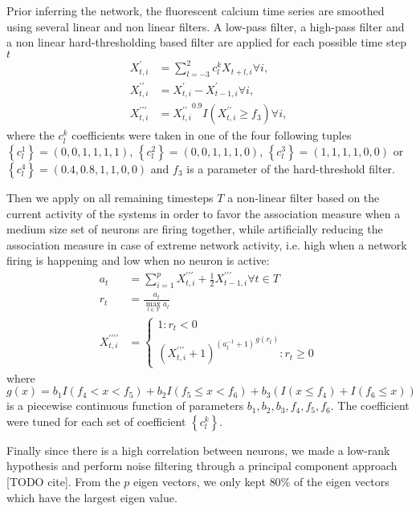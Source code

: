 \documentclass[wcp]{jmlr}
\begin{document}
Prior inferring the network, the fluorescent calcium time series are smoothed
using several linear and non linear filters. A low-pass filter, a high-pass
filter and a non linear hard-thresholding based filter are
applied for each possible time step $t$
\begin{align}
X^\prime_{t,i} &= \sum_{l=-3}^2 c_l^k X_{t+l,i} \forall i, \\
X^{\prime\prime}_{t,i} &= X^{\prime}_{t,i} - X^{\prime}_{t-1,i} \forall i, \\
X^{\prime\prime\prime}_{t,i} &= {X^{\prime\prime}_{t,i}}^{0.9} I(X^{\prime\prime}_{t,i} \geq f_3) \forall i,
\end{align}
where the $c_l^k$ coefficients were taken in one of the four following tuples
$\left\{c_l^1\right\}=(0, 0, 1, 1, 1, 1)$,
$\left\{c_l^2\right\}=(0, 0, 1, 1, 1, 0)$,
$\left\{c_l^3\right\}=(1, 1, 1, 1, 0, 0)$ or
$\left\{c_l^4\right\}=(0.4, 0.8, 1, 1, 0, 0)$ and $f_3$ is a parameter
of the hard-threshold filter.

Then we apply on all remaining timesteps $T$ a non-linear filter based on the current
activity of the systems in order to favor the association measure when
a medium size set of neurons are firing together, while artificially
reducing the association measure in case of extreme network activity,
i.e. high when a network firing is happening and low when no neuron is
active:
\begin{align}
a_t &= \sum_{i=1}^p X^{\prime\prime\prime}_{t,i} +
                   \frac{1}{2} X^{\prime\prime\prime}_{t-1,i} \forall t \in T\\
r_t &= \frac{a_t}{\max_{l \in T}{a_l}} \\
X^{\prime\prime\prime\prime}_{t,i} &=
\left\{
  \begin{array}{l}
    1  : r_t < 0\\
    {(X^{\prime\prime\prime}_{t,i} + 1)^{(a_t^{-1} + 1)}}^{g(r_t)} : r_t \geq 0
  \end{array}
\right.
\end{align}
where $g(x) = b_1 I(f_4 < x < f_5) + b_2  I(f_5 \leq x < f_6) +
b_3 (I(x\leq f_4) + I(f_ 6 \leq x))$ is a piecewise continuous function of
parameters $b_1, b_2, b_3, f_4, f_5, f_6$. The coefficient were tuned
for each set of coefficient $\left\{c_l^k\right\}$.

Finally since there is a high correlation between neurons, we made a
low-rank hypothesis and perform noise filtering through a principal component
approach [TODO cite]. From the $p$ eigen vectors, we only kept $80\%$ of
the eigen vectors which have the largest eigen value.
\end{document}
